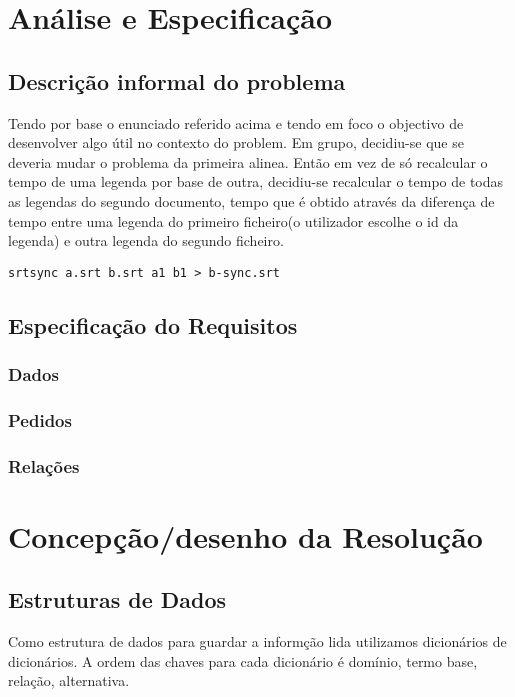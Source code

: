 \documentclass{report}
\begin{document}
\chapter{Análise e Especificação} \label{ae}

\section{Descrição informal do problema}
Tendo por base o enunciado referido acima e tendo em foco o objectivo de desenvolver algo útil no contexto do problem. Em grupo, decidiu-se que se deveria mudar o problema da primeira alinea. 
Então em vez de só recalcular o tempo de uma legenda por base de outra, decidiu-se recalcular o tempo de todas as legendas do segundo documento, tempo que é obtido através da diferença de tempo entre uma legenda do primeiro ficheiro(o utilizador escolhe o id da legenda) e outra legenda do segundo ficheiro.  

\begin{verbatim}
srtsync a.srt b.srt a1 b1 > b-sync.srt 
\end{verbatim}



\section{Especificação do Requisitos}

\subsection{Dados}
\subsection{Pedidos}
\subsection{Relações}


\chapter{Concepção/desenho da Resolução}
\section{Estruturas de Dados}
Como estrutura de dados para guardar a informção lida utilizamos dicionários de dicionários.
A ordem das chaves para cada dicionário é domínio, termo base, relação, alternativa.
\end{document}
